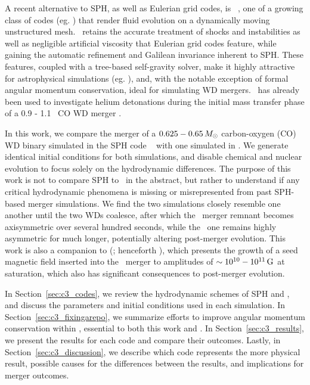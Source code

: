 
A recent alternative to SPH, as well as Eulerian grid codes, is \arepo\ \citep{spri10}, one of a growing class of codes (eg. \citealt{duffm11, gabujl12, vandr16}) that render fluid evolution on a dynamically moving unstructured mesh.  \arepo\ retains the accurate treatment of shocks and instabilities as well as negligible artificial viscosity that Eulerian grid codes feature, while gaining the automatic refinement and Galilean invariance inherent to SPH.  These features, coupled with a tree-based self-gravity solver, make it highly attractive for astrophysical simulations (eg. \citealt{voge+12, pakms13, hayw+14, marips14, ohlm+16}), and, with the notable exception of formal angular momentum conservation, ideal for simulating WD mergers.  \arepo\ has already been used to investigate helium detonations during the initial mass transfer phase of a 0.9 - 1.1 \Msun\ CO WD merger \citep{pakm+13}.

In this work, we compare the merger of a $0.625 - 0.65\,\Msun$ carbon-oxygen (CO) WD binary simulated in the SPH code \gasoline\ \citep{wadssq04} with one simulated in \arepo.  We generate identical initial conditions for both simulations, and disable chemical and nuclear evolution to focus solely on the hydrodynamic differences.  The purpose of this work is not to compare SPH to \arepo\ in the abstract, but rather to understand if any critical hydrodynamic phenomena is missing or misrepresented from past SPH-based merger simulations.  We find the two simulations closely resemble one another until the two WDs coalesce, after which the \gasoline\ merger remnant becomes axisymmetric over several hundred seconds, while the \arepo\ one remains highly asymmetric for much longer, potentially altering post-merger evolution.  This work is also a companion to \citeauthor{zhu+15} (\citeyear{zhu+15}; henceforth \citeal{zhu+15}), which presents the growth of a seed magnetic field inserted into the \arepo\ merger to amplitudes of $\sim10^{10}-10^{11}\,\mathrm{G}$ at saturation, which also has significant consequences to post-merger evolution.

In Section~\ref{sec:c3_codes}, we review the hydrodynamic schemes of SPH and \arepo, and discuss the parameters and initial conditions used in each simulation.  In Section~\ref{sec:c3_fixingarepo}, we summarize efforts to improve angular momentum conservation within \arepo, essential to both this work and \citeal{zhu+15}.  In Section~\ref{sec:c3_results}, we present the results for each code and compare their outcomes.  Lastly, in Section~\ref{sec:c3_discussion}, we describe which code represents the more physical result, possible causes for the differences between the results, and implications for merger outcomes.

